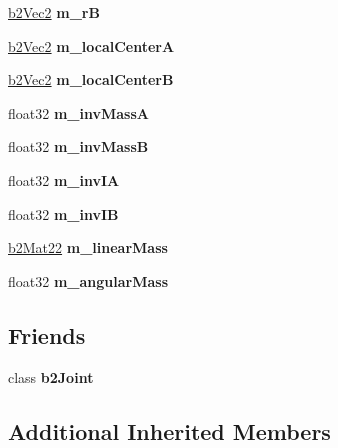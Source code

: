 \begin{DoxyCompactItemize}
\mbox{\hyperlink{structb2Vec2}{b2\+Vec2}} {\bfseries m\+\_\+rB}
\item 
\mbox{\label{classb2FrictionJoint_af732965abe1f29f7469e1ea17506218c}} 
\mbox{\hyperlink{structb2Vec2}{b2\+Vec2}} {\bfseries m\+\_\+local\+CenterA}
\item 
\mbox{\label{classb2FrictionJoint_a55739866c1f3423caf2116e0a869ec45}} 
\mbox{\hyperlink{structb2Vec2}{b2\+Vec2}} {\bfseries m\+\_\+local\+CenterB}
\item 
\mbox{\label{classb2FrictionJoint_a7b7a482216efd081db94465db409fa21}} 
float32 {\bfseries m\+\_\+inv\+MassA}
\item 
\mbox{\label{classb2FrictionJoint_a189a3869e59f6b1e00c83fcaf6b08253}} 
float32 {\bfseries m\+\_\+inv\+MassB}
\item 
\mbox{\label{classb2FrictionJoint_aad004207b7392e9828f55d8f15dc2aa8}} 
float32 {\bfseries m\+\_\+inv\+IA}
\item 
\mbox{\label{classb2FrictionJoint_a79ab8b49c2d4ce6415e3fe9376947d4c}} 
float32 {\bfseries m\+\_\+inv\+IB}
\item 
\mbox{\label{classb2FrictionJoint_aa49bf4b20865a4976c3fae8398191182}} 
\mbox{\hyperlink{structb2Mat22}{b2\+Mat22}} {\bfseries m\+\_\+linear\+Mass}
\item 
\mbox{\label{classb2FrictionJoint_ab8f9aa5e516d90f1c80f92b0eb410c38}} 
float32 {\bfseries m\+\_\+angular\+Mass}
\end{DoxyCompactItemize}
\subsection*{Friends}
\begin{DoxyCompactItemize}
\item 
\mbox{\label{classb2FrictionJoint_a54ade8ed3d794298108d7f4c4e4793fa}} 
class {\bfseries b2\+Joint}
\end{DoxyCompactItemize}
\subsection*{Additional Inherited Members}



